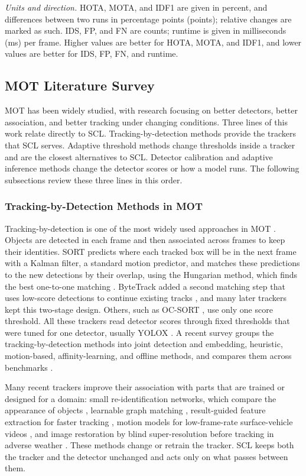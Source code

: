 \documentclass[pdflatex,sn-mathphys-num,iicol]{sn-jnl}
\newcommand{\scl}{SCL}
\begin{document}
\emph{Units and direction.} HOTA, MOTA, and IDF1 are given in percent, and differences between two
runs in percentage points (points); relative changes are marked as such. IDS, FP, and FN are counts;
runtime is given in milliseconds (ms) per frame. Higher values are better for HOTA, MOTA, and IDF1,
and lower values are better for IDS, FP, FN, and runtime.

\subsection{MOT Literature Survey}\label{sec:survey}
MOT has been widely studied, with research focusing on better detectors, better association, and
better tracking under changing conditions. Three lines of this work relate directly to \scl{}.
Tracking-by-detection methods provide the trackers that \scl{} serves. Adaptive threshold methods
change thresholds inside a tracker and are the closest alternatives to \scl{}. Detector calibration
and adaptive inference methods change the detector scores or how a model runs. The following
subsections review these three lines in this order.

\subsubsection{Tracking-by-Detection Methods in MOT}\label{sec:hosts}
Tracking-by-detection is one of the most widely used approaches in MOT \cite{adzemovic2026survey}.
Objects are detected in each frame and then associated across frames to keep their identities.
SORT predicts where each tracked box will be in the next frame with a Kalman filter, a standard
motion predictor, and matches these predictions to the new detections by their overlap, using the
Hungarian method, which finds the best one-to-one matching \cite{bewley2016sort}. ByteTrack added a
second matching step that uses low-score detections to continue existing tracks
\cite{zhang2022bytetrack}, and many later trackers kept this two-stage design. Others, such as
OC-SORT \cite{cao2023ocsort}, use only one score threshold. All these trackers read detector scores
through fixed thresholds that were tuned for one detector, usually YOLOX \cite{ge2021yolox}. A recent
survey groups the tracking-by-detection methods into joint detection and embedding, heuristic,
motion-based, affinity-learning, and offline methods, and compares them across benchmarks
\cite{adzemovic2026survey}.

Many recent trackers improve their association with parts that are trained or designed for a
domain: small re-identification networks, which compare the appearance of objects
\cite{li2024fdbtrack}, learnable graph matching \cite{bao2024graphmatching,zhang2025sinkhorn},
result-guided feature extraction for faster tracking \cite{ding2025remot}, motion models for
low-frame-rate surface-vehicle videos \cite{liang2024motiontrack}, and image restoration by blind
super-resolution before tracking in adverse weather \cite{sun2026bsr}. These methods change or
retrain the tracker. \scl{} keeps both the tracker and the detector unchanged and acts only on what
passes between them.
\end{document}
